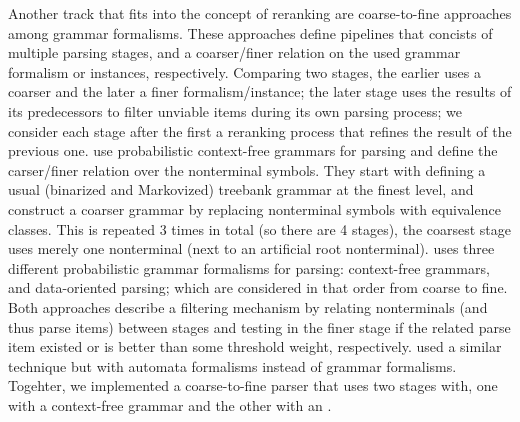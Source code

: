 \documentclass[../document.tex]{subfiles}
\begin{document}
    Another track that fits into the concept of reranking are coarse-to-fine approaches among grammar formalisms.
    These approaches define pipelines that concists of multiple parsing stages, and a coarser/finer relation on the used grammar formalism or instances, respectively.
    Comparing two stages, the earlier uses a coarser and the later a finer formalism/instance; the later stage uses the results of its predecessors to filter unviable items during its own parsing process; we consider each stage after the first a reranking process that refines the result of the previous one.
    \citet{Charniak06} use probabilistic context-free grammars for parsing and define the carser/finer relation over the nonterminal symbols.
    They start with defining a usual (binarized and Markovized) treebank grammar at the finest level, and construct a coarser grammar by replacing nonterminal symbols with equivalence classes.
    This is repeated 3 times in total (so there are 4 stages), the coarsest stage uses merely one nonterminal (next to an artificial root nonterminal).
    \citet{Cranenbourgh16} uses three different probabilistic grammar formalisms for parsing: context-free grammars,  and data-oriented parsing; which are considered in that order from coarse to fine.
    Both approaches describe a filtering mechanism by relating nonterminals (and thus parse items) between stages and testing in the finer stage if the related parse item existed or is better than some threshold weight, respectively.
    \citet{Denkinger18} used a similar technique but with automata formalisms instead of grammar formalisms.
    Togehter, we implemented a coarse-to-fine parser that uses two stages with, one with a context-free grammar and the other with an . \citep{RupDen19} 
    
\end{document}

